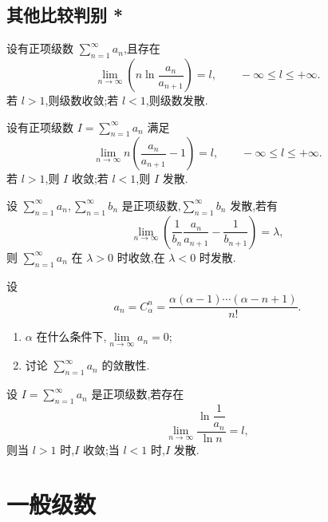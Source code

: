 \documentclass[../../数学分析培优讲义.tex]{subfiles}
\begin{document}
\subsection{其他比较判别 *}

\begin{example}[比值对数判别法]
设有正项级数 $\displaystyle\sum\limits_{n=1}^{\infty}a_n$,且存在
\[
    \lim\limits_{n\to\infty}\left(n\ln\dfrac{a_n}{a_{n+1}}\right)=l,
    \qquad -\infty\leq l\leq+\infty.
\]
若 $l>1$,则级数收敛;若 $l<1$,则级数发散.
\end{example}
\exampleblank

\begin{example}
设有正项级数 $\displaystyle I=\sum\limits_{n=1}^{\infty}a_n$ 满足
\[
    \lim\limits_{n\to\infty}n\left(\dfrac{a_n}{a_{n+1}}-1\right)=l,
    \qquad -\infty\leq l\leq+\infty.
\]
若 $l>1$,则 $I$ 收敛;若 $l<1$,则 $I$ 发散.
\end{example}
\exampleblank

\begin{example}
设 $\displaystyle\sum\limits_{n=1}^{\infty}a_n,\sum\limits_{n=1}^{\infty}b_n$ 是正项级数,$\displaystyle\sum\limits_{n=1}^{\infty}b_n$ 发散,若有
\[
    \lim\limits_{n\to\infty}\left(\dfrac{1}{b_n}\dfrac{a_n}{a_{n+1}}-\dfrac{1}{b_{n+1}}\right)=\lambda,
\]
则 $\displaystyle\sum\limits_{n=1}^{\infty}a_n$ 在 $\lambda>0$ 时收敛,在 $\lambda<0$ 时发散.
\end{example}
\exampleblank

\begin{example}
设
\[
    a_n=C_{\alpha}^{n}=\dfrac{\alpha(\alpha-1)\cdots(\alpha-n+1)}{n!}.
\]
\begin{enumerate}[label=(\arabic*)]
    \item $\alpha$ 在什么条件下,$\displaystyle\lim\limits_{n\to\infty}a_n=0$;
    \item 讨论 $\displaystyle\sum\limits_{n=1}^{\infty}a_n$ 的敛散性.
\end{enumerate}
\end{example}
\exampleblank

\begin{example}[对数判别法]
设 $\displaystyle I=\sum\limits_{n=1}^{\infty}a_n$ 是正项级数,若存在
\[
    \lim\limits_{n\to\infty}\dfrac{\ln\dfrac{1}{a_n}}{\ln n}=l,
\]
则当 $l>1$ 时,$I$ 收敛;当 $l<1$ 时,$I$ 发散.
\end{example}
\exampleblank


\newpage

\section{一般级数}
\end{document}
